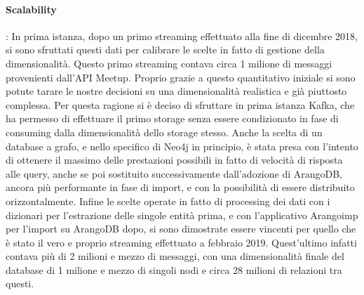 \documentclass[fleqn,10pt]{SelfArx} %
\begin{document}
{{\paragraph{Scalability}: In prima istanza, dopo un primo streaming effettuato alla fine di dicembre 2018, si sono sfruttati questi dati per calibrare le scelte in fatto di gestione della dimensionalità. 
Questo primo streaming contava circa 1 milione di messaggi provenienti dall'API Meetup. 
Proprio grazie a questo quantitativo iniziale si sono potute tarare le nostre decisioni su una dimensionalità realistica e già piuttosto complessa. 
Per questa ragione si è deciso di sfruttare in prima istanza Kafka, che ha permesso di effettuare il primo storage senza essere condizionato in fase di consuming dalla dimensionalità dello storage stesso. 
Anche la scelta di un database a grafo, e nello specifico di Neo4j in principio, è stata presa con l'intento di ottenere il massimo delle prestazioni possibili in fatto di velocità di risposta alle query, anche se poi sostituito successivamente dall'adozione di ArangoDB, ancora più performante in fase di import, e con la possibilità di essere distribuito orizzontalmente. 
Infine le scelte operate in fatto di processing dei dati con i dizionari per l'estrazione delle singole entità prima, e con l'applicativo Arangoimp per l'import su ArangoDB dopo, si sono dimostrate essere vincenti per quello che è stato il vero e proprio streaming effettuato a febbraio 2019.
Quest'ultimo infatti contava più di 2 milioni e mezzo di messaggi, con una dimensionalità finale del database di 1 milione e mezzo di singoli nodi e circa 28 milioni di relazioni tra questi.
}}
\end{document}
